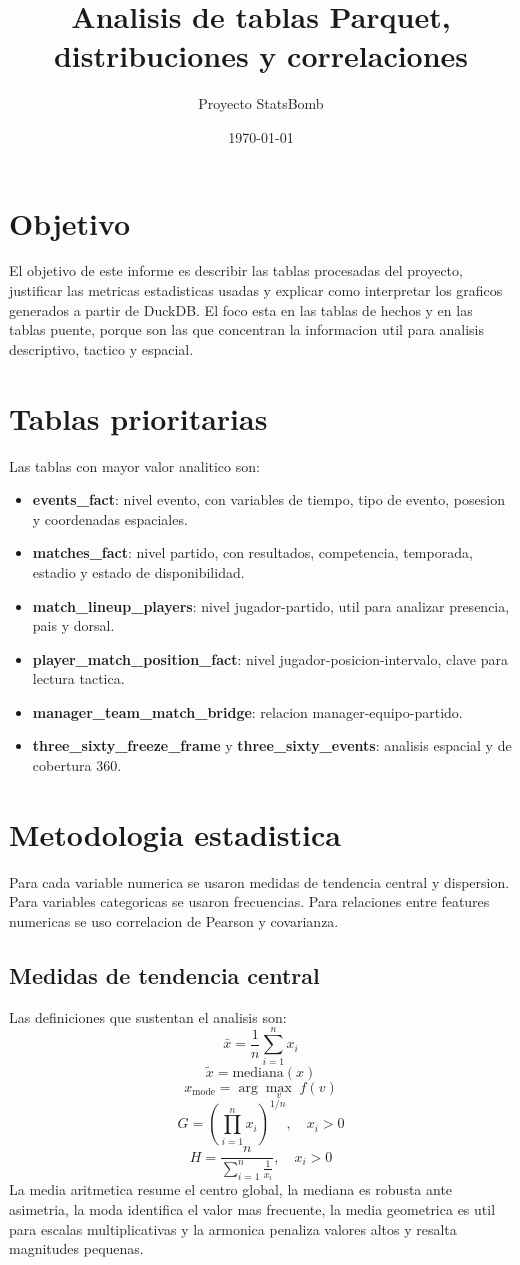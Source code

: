 \documentclass[11pt]{article}
\title{Analisis de tablas Parquet, distribuciones y correlaciones}
\author{Proyecto StatsBomb}
\date{\today}
\begin{document}
\maketitle

\section{Objetivo}
El objetivo de este informe es describir las tablas procesadas del proyecto, justificar las metricas estadisticas usadas y explicar como interpretar los graficos generados a partir de DuckDB. El foco esta en las tablas de hechos y en las tablas puente, porque son las que concentran la informacion util para analisis descriptivo, tactico y espacial.

\section{Tablas prioritarias}
Las tablas con mayor valor analitico son:
\begin{itemize}
  \item \textbf{events\_fact}: nivel evento, con variables de tiempo, tipo de evento, posesion y coordenadas espaciales.
  \item \textbf{matches\_fact}: nivel partido, con resultados, competencia, temporada, estadio y estado de disponibilidad.
  \item \textbf{match\_lineup\_players}: nivel jugador-partido, util para analizar presencia, pais y dorsal.
  \item \textbf{player\_match\_position\_fact}: nivel jugador-posicion-intervalo, clave para lectura tactica.
  \item \textbf{manager\_team\_match\_bridge}: relacion manager-equipo-partido.
  \item \textbf{three\_sixty\_freeze\_frame} y \textbf{three\_sixty\_events}: analisis espacial y de cobertura 360.
\end{itemize}

\section{Metodologia estadistica}
Para cada variable numerica se usaron medidas de tendencia central y dispersion. Para variables categoricas se usaron frecuencias. Para relaciones entre features numericas se uso correlacion de Pearson y covarianza.

\subsection{Medidas de tendencia central}
Las definiciones que sustentan el analisis son:
\[
\bar{x} = \frac{1}{n}\sum_{i=1}^{n} x_i
\]
\[
\tilde{x} = \text{mediana}(x)
\]
\[
x_{\mathrm{mode}} = \arg\max_v \; f(v)
\]
\[
G = \left(\prod_{i=1}^{n} x_i\right)^{1/n}, \quad x_i > 0
\]
\[
H = \frac{n}{\sum_{i=1}^{n} \frac{1}{x_i}}, \quad x_i > 0
\]
La media aritmetica resume el centro global, la mediana es robusta ante asimetria, la moda identifica el valor mas frecuente, la media geometrica es util para escalas multiplicativas y la armonica penaliza valores altos y resalta magnitudes pequenas.
\end{document}
